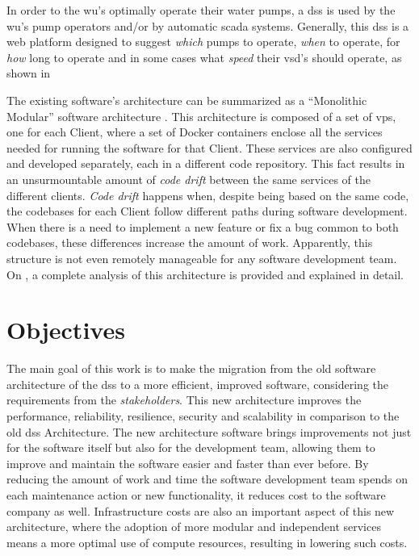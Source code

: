 In order to the \gls{wu}'s optimally operate their water pumps, a \gls{dss} is used by the \gls{wu}'s pump operators and/or by automatic \gls{scada} systems. Generally, this \gls{dss} is a web platform designed to suggest \textit{which} pumps to operate, \textit{when} to operate, for \textit{how} long to operate and in some cases what \textit{speed} their \gls{vsd}'s should operate, as shown in 

The existing software’s architecture can be summarized as a “Monolithic Modular” software architecture \parencite{newman2019monolith}. This architecture is composed of a set of \gls{vps}, one for each Client, where a set of Docker containers enclose all the services needed for running the software for that Client. These services are also configured and developed separately, each in a different code repository. This fact results in an unsurmountable amount of \textit{code drift} between the same services of the different clients. \textit{Code drift} happens when, despite being based on the same code, the codebases for each Client follow different paths during software development. When there is a need to implement a new feature or fix a bug common to both codebases, these differences increase the amount of work. Apparently, this structure is not even remotely manageable for any software development team. On , a complete analysis of this architecture is provided and explained in detail.

\section{Objectives}\label{intro:s:objectives}

The main goal of this work is to make the migration from the old software architecture of the \gls{dss} to a more efficient, improved software, considering the requirements from the \textit{stakeholders}.
This new architecture improves the performance, reliability, resilience, security and scalability in comparison to the old \gls{dss} Architecture. The new architecture software brings improvements not just for the software itself but also for the development team, allowing them to improve and maintain the software easier and faster than ever before. By reducing the amount of work and time the software development team spends on each maintenance action or new functionality, it reduces cost to the software company as well. Infrastructure costs are also an important aspect of this new architecture, where the adoption of more modular and independent services means a more optimal use of compute resources, resulting in lowering such costs.


